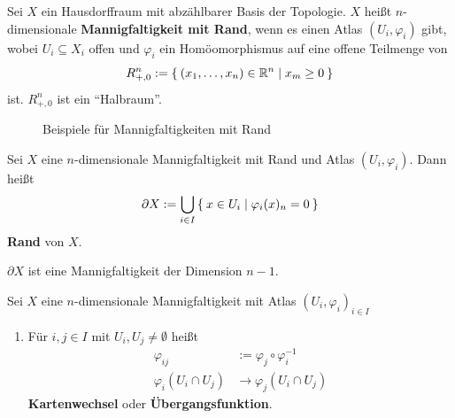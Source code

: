 \begin{definition}
    Sei $X$ ein Hausdorffraum mit abzählbarer Basis der Topologie.
    $X$ heißt $n$-dimensionale \textbf{Mannigfaltigkeit mit Rand},
    wenn es einen Atlas $(U_i, \varphi_i)$ gibt, wobei $U_i \subseteq X_i$
    offen und $\varphi_i$ ein Homöomorphismus auf eine offene 
    Teilmenge von 
    \[R_{+,0}^n := \Set{(x_1, \dots, x_n) \in \ensuremath{\mathbb{R}}^n | x_m \geq 0}\]
    ist. $R_{+,0}^n$ ist ein \enquote{Halbraum}.
\end{definition}

\begin{figure}[ht]
    \centering
    \subfloat[Halbraum]{
        
        \label{fig:half-space}
    }%

    \label{Mannigfaltigkeiten mit Rand}
    \caption{Beispiele für Mannigfaltigkeiten mit Rand}
\end{figure}

\begin{definition}
    Sei $X$ eine $n$-dimensionale Mannigfaltigkeit mit Rand und
    Atlas $(U_i, \varphi_i)$. Dann heißt 
    \[\partial X := \bigcup_{i\in I} \Set{x \in U_i | \varphi_i (x)_n = 0}\]
    \textbf{Rand} von $X$.
\end{definition}

$\partial X$ ist eine Mannigfaltigkeit der Dimension $n-1$.

\begin{definition}
    Sei $X$ eine $n$-dimensionale Mannigfaltigkeit mit Atlas
    $(U_i, \varphi_i)_{i \in I}$

    \begin{enumerate}[label=\alph*)]
        \item Für $i, j \in I$ mit $U_i, U_j \neq \emptyset$ heißt
              \begin{align*}
                \varphi_{ij} &:= \varphi_j \circ \varphi_i^{-1}\\
                \varphi_i (U_i \cap U_j) &\rightarrow \varphi_j (U_i \cap U_j)
              \end{align*}
              \textbf{Kartenwechsel} oder \textbf{Übergangsfunktion}.
    \end{enumerate}
\end{definition}

